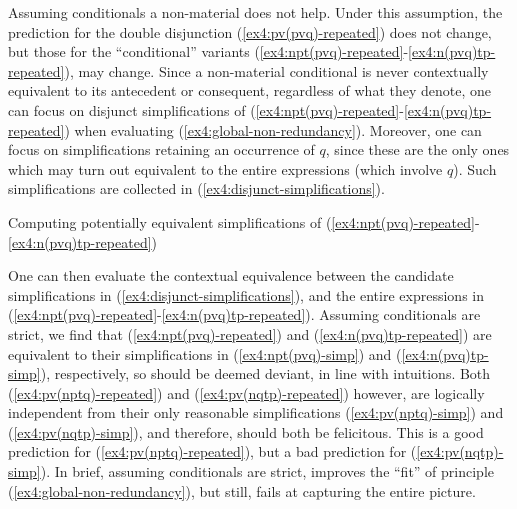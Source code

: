 Assuming conditionals a non-material does not help. Under this assumption, the prediction for the double disjunction (\ref{ex4:pv(pvq)-repeated}) does not change, but those for the ``conditional'' variants (\ref{ex4:npt(pvq)-repeated}-\ref{ex4:n(pvq)tp-repeated}), may change. Since a non-material conditional is never contextually equivalent to its antecedent or consequent, regardless of what they denote, one can focus on disjunct simplifications of (\ref{ex4:npt(pvq)-repeated}-\ref{ex4:n(pvq)tp-repeated}) when evaluating (\ref{ex4:global-non-redundancy}). Moreover, one can focus on simplifications retaining an occurrence of $q$, since these are the only ones which may turn out equivalent to the entire expressions (which involve $q$). Such simplifications are collected in (\ref{ex4:disjunct-simplifications}).

\begin{exe}
	\ex Computing potentially equivalent simplifications of (\ref{ex4:npt(pvq)-repeated}-\ref{ex4:n(pvq)tp-repeated}) \label{ex4:disjunct-simplifications}
	\begin{xlist}
		\ex {(\ref{ex4:npt(pvq)-repeated}): $\neg \p \rightarrow (\cancel{\p \vee} \q)= \neg \p \rightarrow \q$}\label{ex4:npt(pvq)-simp}
		\ex {(\ref{ex4:pv(nptq)-repeated}): $\cancel{\p \vee} (\neg \p \rightarrow \q) = \neg \p \rightarrow \q$}\label{ex4:pv(nptq)-simp}
		\ex {(\ref{ex4:pv(nqtp)-repeated}): $\cancel{\p \vee} (\neg \q \rightarrow \p) = \neg \q \rightarrow \p$}\label{ex4:pv(nqtp)-simp}
		\ex {(\ref{ex4:n(pvq)tp-repeated}): $\neg(\cancel{\p \vee} \q) \rightarrow \p = \neg \q \rightarrow \p$}\label{ex4:n(pvq)tp-simp}
	\end{xlist}
\end{exe}

One can then evaluate the contextual equivalence between the candidate simplifications in (\ref{ex4:disjunct-simplifications}), and the entire expressions in (\ref{ex4:npt(pvq)-repeated}-\ref{ex4:n(pvq)tp-repeated}). Assuming conditionals are strict, we find that (\ref{ex4:npt(pvq)-repeated}) and (\ref{ex4:n(pvq)tp-repeated}) are equivalent to their simplifications in (\ref{ex4:npt(pvq)-simp}) and (\ref{ex4:n(pvq)tp-simp}), respectively, so should be deemed deviant, in line with intuitions. Both (\ref{ex4:pv(nptq)-repeated}) and (\ref{ex4:pv(nqtp)-repeated}) however, are logically independent from their only reasonable simplifications (\ref{ex4:pv(nptq)-simp}) and (\ref{ex4:pv(nqtp)-simp}), and therefore, should both be felicitous. This is a good prediction for (\ref{ex4:pv(nptq)-repeated}), but a bad prediction for (\ref{ex4:pv(nqtp)-simp}). In brief, assuming conditionals are strict, improves the ``fit'' of principle (\ref{ex4:global-non-redundancy}), but still, fails at capturing the entire picture.

